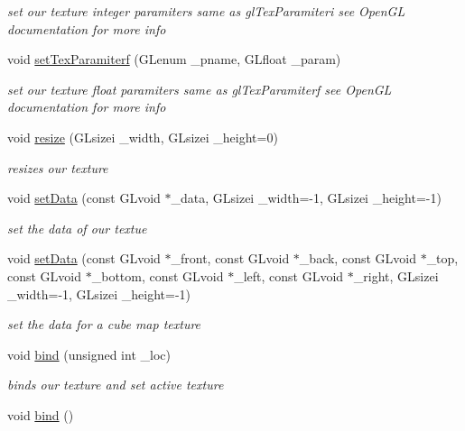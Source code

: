 \begin{DoxyCompactItemize}
\begin{DoxyCompactList}\small\item\em set our texture integer paramiters same as gl\-Tex\-Paramiteri see Open\-G\-L documentation for more info \end{DoxyCompactList}\item 
\hypertarget{class_g_l_texture_a2a2d0c69601ba7843dd33def3f0d28a2}{void \hyperlink{class_g_l_texture_a2a2d0c69601ba7843dd33def3f0d28a2}{set\-Tex\-Paramiterf} (G\-Lenum \-\_\-pname, G\-Lfloat \-\_\-param)}\label{class_g_l_texture_a2a2d0c69601ba7843dd33def3f0d28a2}

\begin{DoxyCompactList}\small\item\em set our texture float paramiters same as gl\-Tex\-Paramiterf see Open\-G\-L documentation for more info \end{DoxyCompactList}\item 
void \hyperlink{class_g_l_texture_a5b70c5df1d184c9be005b0ed05f1e808}{resize} (G\-Lsizei \-\_\-width, G\-Lsizei \-\_\-height=0)
\begin{DoxyCompactList}\small\item\em resizes our texture \end{DoxyCompactList}\item 
void \hyperlink{class_g_l_texture_a9214dfefb40db4fbb7450bcc0ba70b61}{set\-Data} (const G\-Lvoid $\ast$\-\_\-data, G\-Lsizei \-\_\-width=-\/1, G\-Lsizei \-\_\-height=-\/1)
\begin{DoxyCompactList}\small\item\em set the data of our textue \end{DoxyCompactList}\item 
\hypertarget{class_g_l_texture_af20871f52b9705409078558a33a2c73d}{void \hyperlink{class_g_l_texture_af20871f52b9705409078558a33a2c73d}{set\-Data} (const G\-Lvoid $\ast$\-\_\-front, const G\-Lvoid $\ast$\-\_\-back, const G\-Lvoid $\ast$\-\_\-top, const G\-Lvoid $\ast$\-\_\-bottom, const G\-Lvoid $\ast$\-\_\-left, const G\-Lvoid $\ast$\-\_\-right, G\-Lsizei \-\_\-width=-\/1, G\-Lsizei \-\_\-height=-\/1)}\label{class_g_l_texture_af20871f52b9705409078558a33a2c73d}

\begin{DoxyCompactList}\small\item\em set the data for a cube map texture \end{DoxyCompactList}\item 
void \hyperlink{class_g_l_texture_a8fcf4e5253bccd04ffe6e65af228dabc}{bind} (unsigned int \-\_\-loc)
\begin{DoxyCompactList}\small\item\em binds our texture and set active texture \end{DoxyCompactList}\item 
\hypertarget{class_g_l_texture_a3d26fc3a017fd2079ab67e422f9bac10}{void \hyperlink{class_g_l_texture_a3d26fc3a017fd2079ab67e422f9bac10}{bind} ()}\label{class_g_l_texture_a3d26fc3a017fd2079ab67e422f9bac10}


\end{DoxyCompactItemize}

